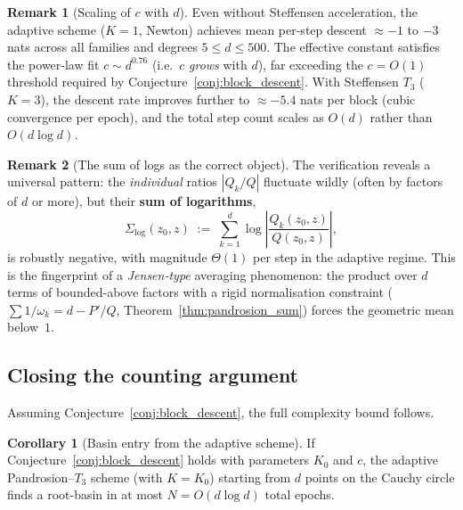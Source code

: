 \documentclass[11pt,a4paper]{article}
\theoremstyle{definition}
\newtheorem{corollary}{Corollary}[section]
\newtheorem{remark}{Remark}[section]
\begin{document}
\begin{remark}[Scaling of $c$ with $d$]
\label{rem:c_scaling}
Even without Steffensen acceleration, the adaptive scheme ($K=1$, Newton) achieves mean per-step descent $\approx -1$ to $-3$ nats across all families and degrees $5 \leq d \leq 500$.  The effective constant satisfies the power-law fit $c \sim d^{0.76}$ (i.e.\ $c$ \emph{grows} with $d$), far exceeding the $c = O(1)$ threshold required by Conjecture~\ref{conj:block_descent}.  With Steffensen $T_3$ ($K = 3$), the descent rate improves further to $\approx -5.4$ nats per block (cubic convergence per epoch), and the total step count scales as $O(d)$ rather than $O(d\log d)$.
\end{remark}

\begin{remark}[The sum of logs as the correct object]
\label{rem:sum_of_logs}
The verification reveals a universal pattern: the \emph{individual} ratios $|Q_k/Q|$ fluctuate wildly (often by factors of $d$ or more), but their \textbf{sum of logarithms},
\begin{equation}
  \label{eq:sum_logs_target}
  \Sigma_{\log}(z_0, z)
  \;:=\;
  \sum_{k=1}^d \log\left|\frac{Q_k(z_0,z)}{Q(z_0,z)}\right|,
\end{equation}
is robustly negative, with magnitude $\Theta(1)$ per step in the adaptive regime.  This is the fingerprint of a \emph{Jensen-type} averaging phenomenon: the product over $d$ terms of bounded-above factors with a rigid normalisation constraint ($\sum 1/\omega_k = d - P'/Q$, Theorem~\ref{thm:pandrosion_sum}) forces the geometric mean below~$1$.
\end{remark}

\subsection{Closing the counting argument}
\label{sec:counting_closure}

Assuming Conjecture~\ref{conj:block_descent}, the full complexity bound follows.

\begin{corollary}[Basin entry from the adaptive scheme]
\label{cor:counting_closure}
If Conjecture~\ref{conj:block_descent} holds with parameters $K_0$ and $c$, the adaptive Pandrosion--$T_3$ scheme (with $K = K_0$) starting from $d$ points on the Cauchy circle finds a root-basin in at most $N = O(d\log d)$ total epochs.
\end{corollary}
\end{document}
